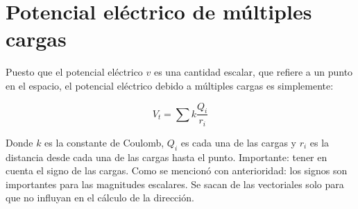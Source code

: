 \section{Potencial eléctrico de múltiples cargas}

Puesto que el potencial eléctrico \(v\) es una cantidad escalar,
que refiere a un punto en el espacio,
el potencial eléctrico debido a múltiples cargas es simplemente:

\vspace{.5cm}
\begin{equation*}
    V_t = \sum k\frac{Q_i}{r_i}
\end{equation*}
\vspace{.5cm}

Donde \(k\) es la constante de Coulomb,
\(Q_i\) es cada una de las cargas y 
\(r_i\) es la distancia desde cada una de las cargas hasta el punto.
Importante: tener en cuenta el signo de las cargas.
Como se mencionó con anterioridad:
los signos son importantes para las magnitudes escalares.
Se sacan de las vectoriales solo para que no influyan en el cálculo de la dirección.
